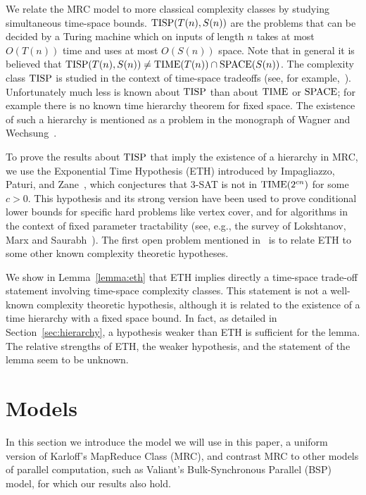 \documentclass[11pt]{article}
\theoremstyle{definition}
\theoremstyle{remark}
\newcommand{\SPACE}{\textup{SPACE}}
\newcommand{\TIME}{\textup{TIME}}
\newcommand{\TISP}{\textup{TISP}}
\begin{document}
We relate the MRC model to more classical complexity classes by studying simultaneous time-space bounds. $\TISP(T(n),S(n))$ are the problems that
can be decided by a Turing machine which on inputs of length $n$ takes at most
$O(T(n))$ time and uses at most $O(S(n))$ space. Note that in general it is
believed that $\TISP(T(n), S(n)) \neq \TIME(T(n)) \cap \SPACE(S(n))$.  The
complexity class $\TISP$ is studied in the context of time-space tradeoffs
(see, for example,~\cite{Fortnow00, Williams08}). Unfortunately much less is
known about $\TISP$ than about $\TIME$ or $\SPACE$; for example there is no
known time hierarchy theorem for fixed space. The existence of such a hierarchy
is mentioned as a problem in the monograph of Wagner and
Wechsung~\cite{WagnerW86}.

To prove the results about $\TISP$ that imply the existence of a hierarchy in
MRC, we use the Exponential Time Hypothesis (ETH) introduced by Impagliazzo,
Paturi, and Zane~\cite{ImpagliazzoP99,ImpagliazzoPZ01}, which conjectures that
3-SAT is not in $\TIME(2^{cn})$ for some $c>0$. This hypothesis and its strong
version have been used to prove conditional lower bounds for specific hard
problems like vertex cover, and for algorithms in the context of fixed
parameter tractability (see, e.g., the survey of Lokshtanov, Marx and
Saurabh~\cite{LokshtanovMS11}). The first open problem mentioned
in~\cite{LokshtanovMS11} is to relate ETH to some other known complexity
theoretic hypotheses.

We show in Lemma~\ref{lemma:eth} that ETH implies directly a time-space
trade-off statement involving time-space complexity classes. This statement is
not a well-known complexity theoretic hypothesis, although it is related to the
existence of a time hierarchy with a fixed space bound. In fact, as detailed in
Section~\ref{sec:hierarchy}, a hypothesis weaker than ETH is sufficient for the
lemma. The relative strengths of ETH, the weaker hypothesis, and the statement
of the lemma seem to be unknown.

\section{Models} \label{sec:definition}

In this section we introduce the model we will use in this paper, a uniform
version of Karloff's MapReduce Class (MRC), and contrast MRC to other models of parallel computation, such as Valiant's Bulk-Synchronous
Parallel (BSP) model, for which our results also hold.
\end{document}

